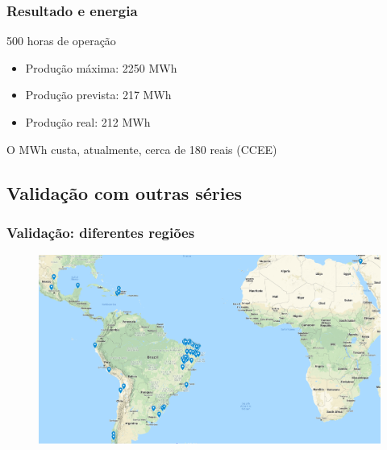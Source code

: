 \documentclass[mathserif,serif]{beamer}
\begin{document}
\begin{frame}
	\frametitle{Resultado e energia}
	\begin{alertblock}{500 horas de operação}
		\begin{itemize}
			\item Produção máxima: 2250 MWh
			\item Produção prevista: 217 MWh
			\item Produção real: 212 MWh
		\end{itemize}
	\end{alertblock}
	
	O MWh custa, atualmente, cerca de 180 reais (CCEE)
\end{frame}
	
\subsection{Validação com outras séries}

\begin{frame}
	\frametitle{Validação: diferentes regiões}
	\begin{figure}
		\centering
		\includegraphics[width=\textwidth]{latam}
	\end{figure}
\end{frame}
\end{document}
